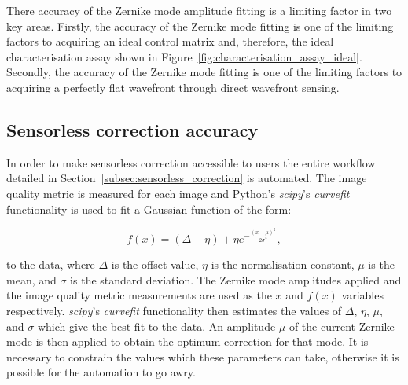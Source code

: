 There accuracy of the Zernike mode amplitude fitting is a limiting factor in two key areas. Firstly, the accuracy of the Zernike mode fitting is one of the limiting factors to acquiring an ideal control matrix and, therefore, the ideal characterisation assay shown in Figure~\ref{fig:characterisation_assay_ideal}. Secondly, the accuracy of the Zernike mode fitting is one of the limiting factors to acquiring a perfectly flat wavefront through direct wavefront sensing.

\subsection{Sensorless correction accuracy}
\label{subsec:sensorless_accuracy}

In order to make sensorless correction accessible to users the entire 
workflow detailed in Section~\ref{subsec:sensorless_correction} is 
automated. The image quality metric is measured for each image and Python's 
\textit{scipy}'s \textit{curve\textunderscore fit} 
functionality\cite{virtanen2020scipy} is used to fit a Gaussian function of 
the form:

\begin{equation}\label{eq:gaussian}
f(x) = (\Delta - \eta) + \eta e^{-\frac{\left(x-\mu\right)^{2}}{2\sigma^{2}}},
\end{equation}

to the data, where $\Delta$ is the offset value, $\eta$ is the 
normalisation constant, $\mu$ is the mean, and $\sigma$ is the standard 
deviation. The Zernike mode amplitudes applied and the image quality metric 
measurements are used as the $x$ and $f(x)$ variables respectively. 
\textit{scipy}'s \textit{curve\textunderscore fit} functionality then 
estimates the values of $\Delta$, $\eta$, $\mu$, and $\sigma$ which give 
the best fit to the data. An amplitude $\mu$ of the current Zernike mode is 
then applied to obtain the optimum correction for that mode. It is necessary to 
constrain the values which these parameters can take, otherwise it is 
possible for the automation to go awry.

